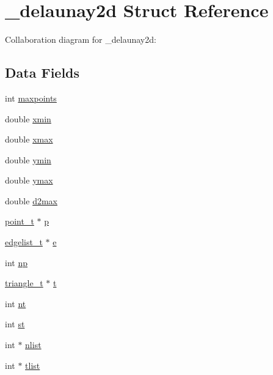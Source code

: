 \hypertarget{struct__delaunay2d}{}\section{\+\_\+delaunay2d Struct Reference}
\label{struct__delaunay2d}


Collaboration diagram for \+\_\+delaunay2d\+:
\subsection*{Data Fields}
\begin{DoxyCompactItemize}
\item 
int \hyperlink{struct__delaunay2d_aeb1ede9bd68d547583d88e503bfe076b}{maxpoints}
\item 
double \hyperlink{struct__delaunay2d_acdbdc893ccf7387fa23a4080e81fb9ca}{xmin}
\item 
double \hyperlink{struct__delaunay2d_aaaf061fa3cd37e06112d371ac51cb45c}{xmax}
\item 
double \hyperlink{struct__delaunay2d_a0a528fa659fd4d3752829f35258218e6}{ymin}
\item 
double \hyperlink{struct__delaunay2d_a59956cb6ab3c7d581c8e6bb15eeeb8fb}{ymax}
\item 
double \hyperlink{struct__delaunay2d_a2f1977f93092cb3662893a1f7096d9e4}{d2max}
\item 
\hyperlink{delaunay2d_8c_a10113fa111734396b2066f3fa38c9584}{point\+\_\+t} $\ast$ \hyperlink{struct__delaunay2d_af57685b4023a92bf3135552ed0ee62b7}{p}
\item 
\hyperlink{delaunay2d_8c_a55bb0c3df7dd32562d87e85d2efb358d}{edgelist\+\_\+t} $\ast$ \hyperlink{struct__delaunay2d_ad7e8751212a91171cb56564db1b18db7}{e}
\item 
int \hyperlink{struct__delaunay2d_a500c62d65aa3effdb3aa71511444aeb3}{np}
\item 
\hyperlink{delaunay2d_8c_ae5a0851eee0deb406207328b9b67583f}{triangle\+\_\+t} $\ast$ \hyperlink{struct__delaunay2d_af58f6fb997972b822e124155bad75b6c}{t}
\item 
int \hyperlink{struct__delaunay2d_a04dd3e53c2c24c4e1240f498951460bc}{nt}
\item 
int \hyperlink{struct__delaunay2d_ab7dee2827d60562087f5abd1c9635462}{st}
\item 
int $\ast$ \hyperlink{struct__delaunay2d_acc0f496eafa28575a6c35af61f07ca4d}{nlist}
\item 
int $\ast$ \hyperlink{struct__delaunay2d_afb1ae08fc1d4bfc95c87db7efff82d67}{tlist}

\end{DoxyCompactItemize}
